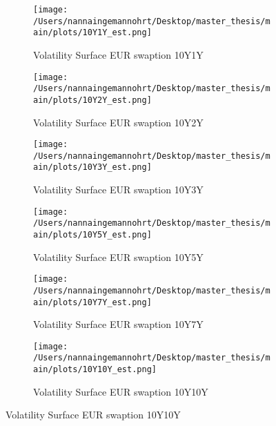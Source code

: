 \begin{figure}[htbp]
    \centering
    \begin{subfigure}{0.43\textwidth}
        \texttt{[image: /Users/nannaingemannohrt/Desktop/master\_thesis/main/plots/10Y1Y\_est.png]}
        \caption{Volatility Surface EUR swaption 10Y1Y}
        \label{fig:10Y1Y_}
    \end{subfigure}\hfill
    \begin{subfigure}{0.43
        \textwidth}
        \texttt{[image: /Users/nannaingemannohrt/Desktop/master\_thesis/main/plots/10Y2Y\_est.png]}
        \caption{Volatility Surface EUR swaption 10Y2Y}
        \label{fig:10Y2Y_}
    \end{subfigure}
    \begin{subfigure}{0.43\textwidth}
        \texttt{[image: /Users/nannaingemannohrt/Desktop/master\_thesis/main/plots/10Y3Y\_est.png]}
        \caption{Volatility Surface EUR swaption 10Y3Y}
        \label{fig:10Y3Y_}
    \end{subfigure}\hfill
    \begin{subfigure}{0.43\textwidth}
        \texttt{[image: /Users/nannaingemannohrt/Desktop/master\_thesis/main/plots/10Y5Y\_est.png]}
        \caption{Volatility Surface EUR swaption 10Y5Y}
        \label{fig:10Y5Y_}
    \end{subfigure}
    \begin{subfigure}{0.43\textwidth}
        \texttt{[image: /Users/nannaingemannohrt/Desktop/master\_thesis/main/plots/10Y7Y\_est.png]}
        \caption{Volatility Surface EUR swaption 10Y7Y}
        \label{fig:10Y7Y_}
    \end{subfigure}\hfill
    \begin{subfigure}{0.43\textwidth}
        \texttt{[image: /Users/nannaingemannohrt/Desktop/master\_thesis/main/plots/10Y10Y\_est.png]}
        \caption{Volatility Surface EUR swaption 10Y10Y}
        \label{fig:10Y10Y_}
    \end{subfigure}


\end{figure}
